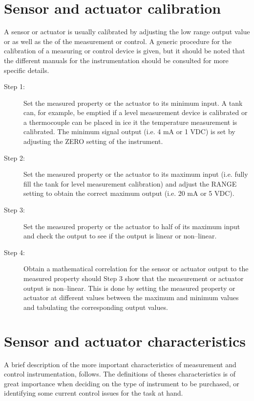\section{Sensor and actuator calibration}
A sensor or actuator is usually calibrated by adjusting the low range output value or  as well as the  of the measurement or control. A generic procedure for the calibration of a measuring or control device is given, but it should be noted that the different manuals for the instrumentation should be consulted for more specific details.
\begin{description}
	\item [Step 1:]Set the measured property or the actuator to its minimum input. A tank can, for example, be emptied if a level measurement device is calibrated or a thermocouple can be placed in ice it the temperature measurement is calibrated. The minimum signal output (i.e. 4 mA or 1 VDC) is set by adjusting the ZERO setting of the instrument.
	\item [Step 2:]Set the measured property or the actuator to its maximum input (i.e. fully fill the tank for level measurement calibration) and adjust the RANGE setting to obtain the correct maximum output (i.e. 20 mA or 5 VDC).
	\item [Step 3:]Set the measured property or the actuator to half of its maximum input and check the output to see if the output is linear or non--linear.
	\item [Step 4:]Obtain a mathematical correlation for the sensor or actuator output to the measured property should Step 3 show that the measurement or actuator output is non--linear. This is done by setting the measured property or actuator at different values between the maximum and minimum values and tabulating the corresponding output values.
\end{description}

\section{Sensor and actuator characteristics}
A brief description of the more important characteristics of measurement and control instrumentation, follows. The definitions of theses characteristics is of great importance when deciding on the type of instrument to be purchased, or identifying some current control issues for the task at hand. 

